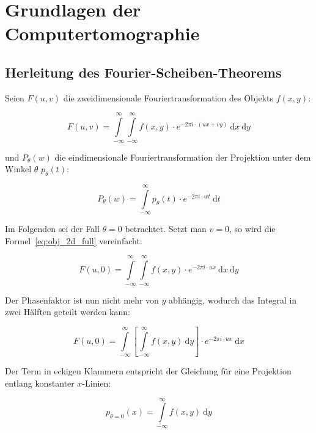 \appendix

\chapter{Grundlagen der Computertomographie}

\section{Herleitung des Fourier-Scheiben-Theorems}\label{app:fourier_scheibe}

Seien $F(u, v)$ die zweidimensionale
Fouriertransformation des Objekts $f(x, y)$:

\begin{equation}\label{eq:obj_2d_full}
    F(u, v) = \int\limits_{-\infty}^{\infty} \int\limits_{-\infty}^{\infty} f(x, y) \cdot e^{-2 \pi i \cdot(u x + v y)}\
        \mathrm{d} x\ \mathrm{d} y
\end{equation}

und $P_{\theta}(w)$ die eindimensionale Fouriertransformation der Projektion unter dem Winkel $\theta$ $p_{\theta}(t)$:

\begin{equation}\label{eq:proj_fft}
    P_{\theta}(w) = \int\limits_{-\infty}^{\infty} p_{\theta}(t) \cdot e^{-2 \pi i \cdot w t}\ \mathrm{d} t
\end{equation}

Im Folgenden sei der Fall $\theta = 0$ betrachtet. Setzt man $v = 0$, so wird die Formel~\ref{eq:obj_2d_full}
vereinfacht:

\begin{equation}
    F(u, 0) = \int\limits_{-\infty}^{\infty} \int\limits_{-\infty}^{\infty} f(x, y) \cdot e^{-2 \pi i \cdot u x}\
    \mathrm{d} x\ \mathrm{d} y
\end{equation}

Der Phasenfaktor ist nun nicht mehr von $y$ abhängig, wodurch das Integral in zwei Hälften geteilt werden kann:

\begin{equation}\label{eq:obj_2d_split}
    F(u, 0) = \int\limits_{-\infty}^{\infty} \left[\int\limits_{-\infty}^{\infty} f(x, y)\ \mathrm{d} y \right] \cdot
    e^{-2 \pi i \cdot u x}\ \mathrm{d} x
\end{equation}

Der Term in eckigen Klammern entspricht der Gleichung für eine Projektion entlang konstanter $x$-Linien:

\begin{equation}
    p_{\theta = 0}(x) = \int\limits_{-\infty}^{\infty} f(x, y)\ \mathrm{d} y
\end{equation}


